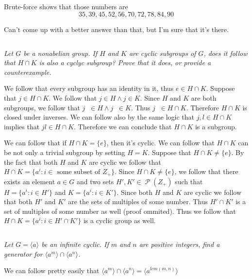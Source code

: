 \documentclass[11pt,oneside,titlepage]{book}
\DeclareMathOperator \pow {\mathcal {P}}
\DeclareMathOperator \inv {^{-1}}
\newcommand{\eangle}[1]{\langle #1 \rangle}
\newcommand{\set}[1]{\{ #1 \}}
\begin{document}
Brute-force shows that those numbers are
$$35, 39, 45, 52, 56, 70, 72, 78, 84, 90$$

Can't come up with a better answer than that, but I'm sure that it's there.

\subsection{}

\textit{Let $G$ be a nonabelian group. If $H$ and $K$ are cyclic subgroups of $G$,
  does it follow that $H \cap K$ is also a cyclyc subgroup? Prove that it does,
  or provide a counterexample.}

We follow that every subgroup has an identity in it, thus $e \in H \cap K$.
Suppose that $j \in H \cap K$. We follow that $j \in H \land j \in K$. Since $H$
and $K$ are both subgroups, we follow that $j \inv \in H \land j\inv \in K$. Thus
$j \inv \in H \cap K$. Therefore $H \cap K$ is closed under inverses.
We can follow also by the same logic that $j, l \in H \cap K$ implies that
$jl \in H \cap K$. Therefore we can conclude that $H \cap K$ is a subgroup.

We can follow that if $H \cap K = \set{e}$, then it's cyclic. We can follow that
$H \cap K$ can be not only a trivial subgroup by setting $H = K$. Suppose that
$H \cap K \neq \set{e}$. By the fact that both $H$ and $K$ are cyclic we follow that
$H \cap K = \set{a^i: i \in \text{ some subset of } Z_+}$.
Since $H \cap K \neq \set{e}$, we follow that there exists an element $a \in G$ and
two sets $H', K' \in \pow(Z_+)$ such that $H = \set{a^i: i \in H'}$ and
$K = \set{a^i: i \in K'}$. Since both $H$ and $K$ are cyclic we follow that
both $H'$ and $K'$ are the sets of multiples of some number. Thus
$H' \cap K'$ is a set of multiples of some number as well (proof ommited). Thus we
follow that $H \cap K = \set{a^i: i \in H' \cap K'}$ is a cyclic group as well.

\subsection{}

\textit{Let $G = \eangle{a}$ be an infinite cyclic. If $m$ and $n$ are positive integers,
find a generator for $\eangle{a^m} \cap \eangle{a^n}$.}

We can follow pretty easily that $\eangle{a^m} \cap \eangle{a^n} =
\eangle{a^{lcm(m, n)}}$
\end{document}
